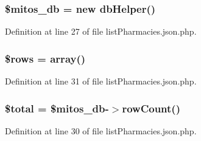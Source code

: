 \hypertarget{list_pharmacies_8json_8php_ab5d961f93efe4e2e8d8374f01dd6c65a}{
\subsubsection[{\$mitos\-\_\-db}]{\setlength{\rightskip}{0pt plus 5cm}\$mitos\-\_\-db = new {\bf db\-Helper}()}}\label{list_pharmacies_8json_8php_ab5d961f93efe4e2e8d8374f01dd6c65a}


\-Definition at line 27 of file list\-Pharmacies.\-json.\-php.

\hypertarget{list_pharmacies_8json_8php_ace2ec39e7df3899fa8df9640ec274b03}{
\subsubsection[{\$rows}]{\setlength{\rightskip}{0pt plus 5cm}\$rows = array()}}\label{list_pharmacies_8json_8php_ace2ec39e7df3899fa8df9640ec274b03}


\-Definition at line 31 of file list\-Pharmacies.\-json.\-php.

\hypertarget{list_pharmacies_8json_8php_a241b818f48030b628685b2e5119c5624}{
\subsubsection[{\$total}]{\setlength{\rightskip}{0pt plus 5cm}\$total = \$mitos\-\_\-db-\/$>$row\-Count()}}\label{list_pharmacies_8json_8php_a241b818f48030b628685b2e5119c5624}


\-Definition at line 30 of file list\-Pharmacies.\-json.\-php.

